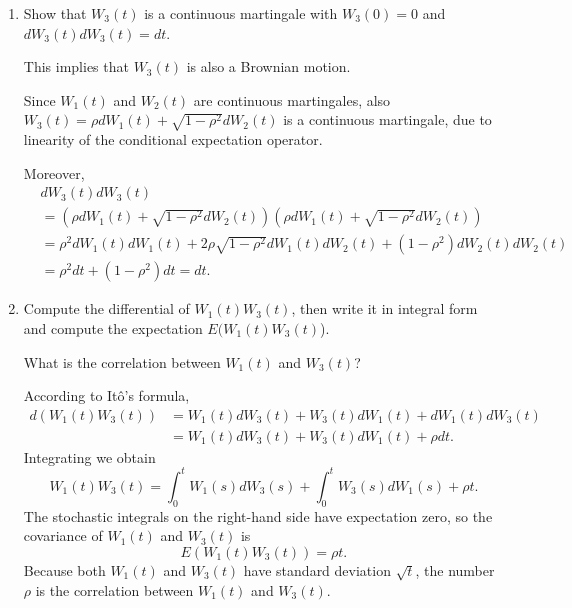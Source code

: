 \documentclass[handout,8pt]{beamer}
\begin{document}
\begin{frame}[allowframebreaks]{ }
\begin{enumerate}
    \begin{enumerate}
        \item Show that $W_3(t)$ is a continuous martingale with $W_3(0)=0$ and $dW_3(t) dW_3(t) = dt$. \newline
        
         This implies that $W_3(t)$ is also a Brownian motion.\newline
        
        Since $W_1(t)$ and $W_2(t)$ are continuous martingales, also $W_3(t) = \rho dW_1(t) + \sqrt{1-\rho^2} dW_2(t)$ is a continuous martingale, due to linearity of the conditional expectation operator. \newline
        
        Moreover, \newline 
        \begin{align*}
            &dW_3(t)dW_3(t) \\
            &= \left(\rho dW_1(t) + \sqrt{1-\rho^2} dW_2(t)\right) \left(\rho dW_1(t) + \sqrt{1-\rho^2} dW_2(t)\right)\\
            &= \rho^2 dW_1(t)dW_1(t) + 2\rho\sqrt{1-\rho^2} dW_1(t)dW_2(t) + (1-\rho^2) dW_2(t)dW_2(t)\\
            &= \rho^2 dt + (1-\rho^2) dt= dt.
        \end{align*}
        
        \item Compute the differential of $W_1(t) W_3(t)$, then write it in integral form and compute the expectation $E(W_1(t)W_3(t)$). \newline
        
        What is the correlation between $W_1(t)$ and $W_3(t)$? \newline 
        
        According to Itô's formula,
        \begin{align*}
            d(W_1(t)W_3(t)) &= W_1(t) dW_3(t) + W_3(t) dW_1(t) + dW_1(t)dW_3(t)\\
            &= W_1(t) dW_3(t) + W_3(t) dW_1(t) +\rho dt.
        \end{align*}
        Integrating we obtain
        \begin{equation*}
            W_1(t) W_3(t) = \int_0^t W_1(s) dW_3(s) + \int_0^t W_3(s) dW_1(s) + \rho t.
        \end{equation*}
        The stochastic integrals on the right-hand side have expectation zero, so the covariance of $W_1(t)$ and $W_3(t)$ is
        \begin{equation*}
            E(W_1(t)W_3(t)) = \rho t.
        \end{equation*}
        Because both $W_1(t)$ and $W_3(t)$ have standard deviation $\sqrt{t}$, the number $\rho$ is the correlation between $W_1(t)$  and $W_3(t)$.
    \end{enumerate}
    

\end{enumerate}
\end{frame}
\end{document}
